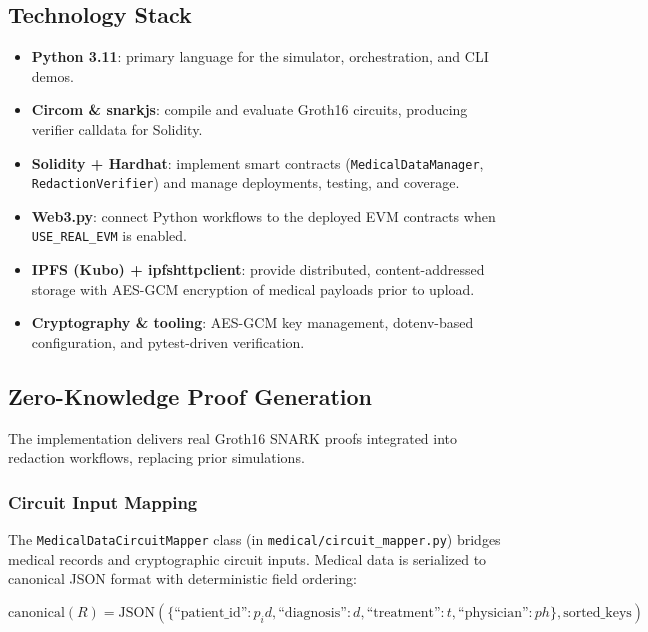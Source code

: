\subsection{Technology Stack}
\begin{itemize}
    \item \textbf{Python 3.11}: primary language for the simulator, orchestration, and CLI demos.
    \item \textbf{Circom \& snarkjs}: compile and evaluate Groth16 circuits, producing verifier calldata for Solidity.
    \item \textbf{Solidity + Hardhat}: implement smart contracts (\texttt{MedicalDataManager}, \texttt{RedactionVerifier}) and manage deployments, testing, and coverage.
    \item \textbf{Web3.py}: connect Python workflows to the deployed EVM contracts when \texttt{USE\_REAL\_EVM} is enabled.
    \item \textbf{IPFS (Kubo) + ipfshttpclient}: provide distributed, content-addressed storage with AES-GCM encryption of medical payloads prior to upload.
    \item \textbf{Cryptography \& tooling}: AES-GCM key management, dotenv-based configuration, and pytest-driven verification.
\end{itemize}

\subsection{Zero-Knowledge Proof Generation}
\label{subsec:zk_proofs}

The implementation delivers real Groth16 SNARK proofs integrated into redaction workflows, replacing prior simulations.

\subsubsection{Circuit Input Mapping}

The \texttt{MedicalDataCircuitMapper} class (in \texttt{medical/circuit\_mapper.py}) bridges medical records and cryptographic circuit inputs. Medical data is serialized to canonical JSON format with deterministic field ordering:

\begin{equation}
    \text{canonical}(R) = \text{JSON}(\{
        \text{``patient\_id''}: p_id,
        \text{``diagnosis''}: d,
        \text{``treatment''}: t,
        \text{``physician''}: ph
    \}, \text{sorted\_keys})
\end{equation}

